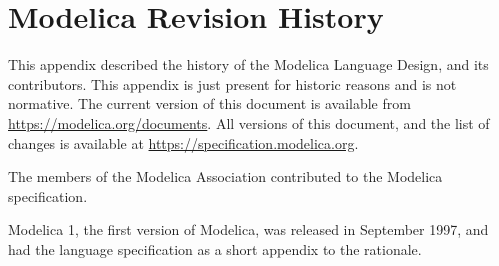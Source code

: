\chapter{Modelica Revision History}\label{modelica-revision-history}

This appendix described the history of the Modelica Language Design, and its contributors.
This appendix is just present for historic reasons and is not normative.
The current version of this document is available from \url{https://modelica.org/documents}.
All versions of this document, and the list of changes is available at \url{https://specification.modelica.org}.

The members of the Modelica Association contributed to the Modelica specification.

Modelica 1, the first version of Modelica, was released in September 1997, and had the language specification as a short appendix to the rationale.
